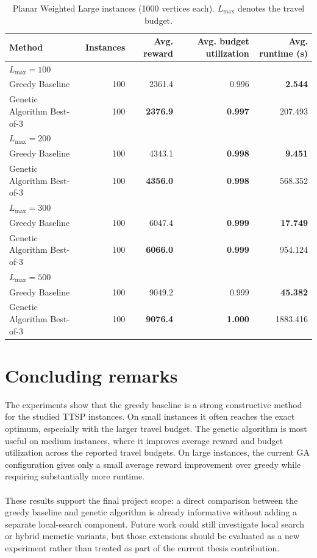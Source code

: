 \documentclass[report,english,cleveref,autoref,a4paper]{lipics-v2021}
\begin{document}
\begin{table}[ht]
\centering
\caption{Planar Weighted Large instances (1000 vertices each). $L_{\max}$ denotes the travel budget.}
\scriptsize
\setlength{\tabcolsep}{3pt}
\begin{tabular}{|l|r|r|r|r|}
\hline
Method & Instances & Avg. reward & Avg. budget utilization & Avg. runtime (s) \\
\hline
\multicolumn{5}{|l|}{$L_{\max}=100$} \\
\hline
Greedy Baseline & 100 & 2361.4 & 0.996 & \textbf{2.544} \\
\hline
Genetic Algorithm Best-of-3 & 100 & \textbf{2376.9} & \textbf{0.997} & 207.493 \\
\hline
\multicolumn{5}{|l|}{$L_{\max}=200$} \\
\hline
Greedy Baseline & 100 & 4343.1 & \textbf{0.998} & \textbf{9.451} \\
\hline
Genetic Algorithm Best-of-3 & 100 & \textbf{4356.0} & \textbf{0.998} & 568.352 \\
\hline
\multicolumn{5}{|l|}{$L_{\max}=300$} \\
\hline
Greedy Baseline & 100 & 6047.4 & \textbf{0.999} & \textbf{17.749} \\
\hline
Genetic Algorithm Best-of-3 & 100 & \textbf{6066.0} & \textbf{0.999} & 954.124 \\
\hline
\multicolumn{5}{|l|}{$L_{\max}=500$} \\
\hline
Greedy Baseline & 100 & 9049.2 & 0.999 & \textbf{45.382} \\
\hline
Genetic Algorithm Best-of-3 & 100 & \textbf{9076.4} & \textbf{1.000} & 1883.416 \\
\hline
\end{tabular}
\label{tab:planar-weighted-large-ttsp-results}
\end{table}

\section{Concluding remarks}
The experiments show that the greedy baseline is a strong constructive method
for the studied TTSP instances. On small instances it often reaches the exact
optimum, especially with the larger travel budget. The genetic algorithm is most
useful on medium instances, where it improves average reward and budget
utilization across the reported travel budgets. On large instances, the current
GA configuration gives only a small average reward improvement over greedy while
requiring substantially more runtime.
\\ \\
These results support the final project scope: a direct comparison between the
greedy baseline and genetic algorithm is already informative without adding a
separate local-search component. Future work could still investigate local
search or hybrid memetic variants, but those extensions should be evaluated as a
new experiment rather than treated as part of the current thesis contribution.
\end{document}
